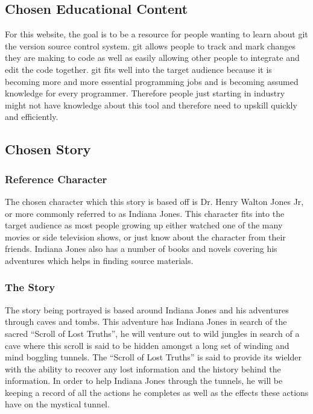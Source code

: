 \subsection{Chosen Educational Content}\label{sec:content}
For this website, the goal is to be a resource for people wanting to learn about \gls{git} the version source control system. \Gls{git} allows people to track and mark changes they are making to code as well as easily allowing other people to integrate and edit the code together. \Gls{git} fits well into the target audience because it is becoming more and more essential programming jobs and is becoming assumed knowledge for every programmer. Therefore people just starting in industry might not have knowledge about this tool and therefore need to upskill quickly and efficiently.

\subsection{Chosen Story}
\subsubsection{Reference Character}
The chosen character which this story is based off is Dr. Henry Walton Jones Jr, or more commonly referred to as Indiana Jones. This character fits into the target audience as most people growing up either watched one of the many movies or side television shows, or just know about the character from their friends. Indiana Jones also has a number of books and novels covering his adventures which helps in finding source materials.

\subsubsection{The Story}\label{sec:TheStory}
The story being portrayed is based around Indiana Jones and his adventures through caves and tombs. This adventure has Indiana Jones in search of the sacred ``Scroll of Lost Truths'', he will venture out to wild jungles in search of a cave where this scroll is said to be hidden amongst a long set of winding and mind boggling tunnels. The ``Scroll of Lost Truths'' is said to provide its wielder with the ability to recover any lost information and the history behind the information. In order to help Indiana Jones through the tunnels, he will be keeping a record of all the actions he completes as well as the effects these actions have on the mystical tunnel.


